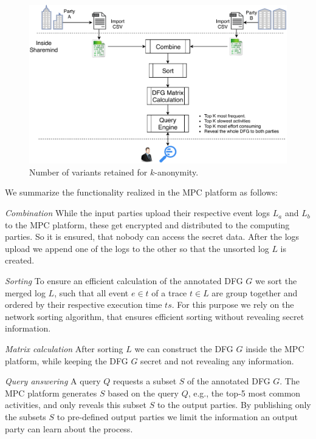 
\begin{figure}[!htb]
	\centering
	\includegraphics[width=.95\columnwidth]{figures/mpc_algorithm}
	\caption{Number of variants retained for $k$-anonymity.}
	\label{fig:overview}
\end{figure}

\noindent
We summarize the functionality realized in the MPC platform as 
follows:
\begin{compactitem}
\item[\emph{Combination}] While the input parties upload their respective event logs $L_a$ and $L_b$ to the MPC platform, these get encrypted and distributed to the computing parties. So it is ensured, that nobody can access the secret data. After the logs upload we append one of the logs to the other so that the unsorted log $L$ is created.
\item[\emph{Sorting}] To ensure an efficient calculation of the annotated DFG $G$ we sort the merged log $L$, such that all event $e \in t$ of a trace $t \in L$ are group together and ordered by their respective execution time $ts$. For this purpose we rely on the network sorting algorithm\cite{bogdanov2014practical}, that ensures efficient sorting without revealing secret information.
\item[\emph{Matrix calculation}] After sorting $L$ we can construct the DFG $G$ inside the MPC platform, while keeping the DFG $G$ secret and not revealing any information.
\item[\emph{Query answering}] A query $Q$ requests a subset $S$ of the annotated DFG $G$. The MPC platform generates $S$ based on the query $Q$, e.g., the top-5 most common activities, and only reveals this subset $S$ to the output parties. By publishing only the subsets $S$ to pre-defined output parties we limit the information an output party can learn about the process. 
\end{compactitem}

